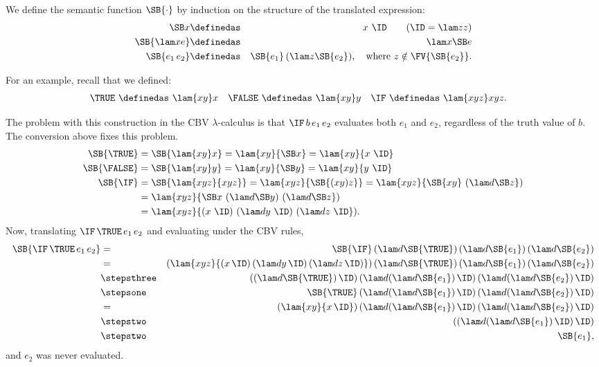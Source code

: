 We define the semantic function $\SB{\cdot}$ by
induction on the structure of the translated expression:
\begin{eqnarray*}
\SB x &\definedas& x~\ID \qquad (\ID = \lam zz)    \\
\SB{\lam xe} &\definedas& \lam x{\SB e}        \\
\SB{e_1\,e_2} &\definedas& \SB{e_1}\,(\lam z{\SB{e_2}}),
  \quad\mbox{where $z\notin\FV{\SB{e_2}}$.}
\end{eqnarray*}

For an example, recall that we defined: 
\begin{align*}
\TRUE\ &\definedas\ \lam{xy}x & \FALSE\ &\definedas\ \lam{xy}y & \IF\ &\definedas\ \lam{xyz}xyz.
\end{align*}

The problem with this construction in the CBV $\lambda$-calculus is that
$\IF\,b\,e_1\,e_2$ evaluates both $e_1$ and $e_2$, regardless of the truth
value of $b$. The conversion above fixes this problem.
\begin{align*}
\SB{\TRUE} &= \SB{\lam{xy}x} = \lam{xy}{\SB x} = \lam{xy}{x~\ID}\\
\SB{\FALSE} &= \SB{\lam{xy}y} = \lam{xy}{\SB y} = \lam{xy}{y~\ID}\\
\SB{\IF} &= \SB{\lam{xyz}{xyz}} = \lam{xyz}{\SB{(xy)z}} = \lam{xyz}{\SB{xy}~(\lam d{\SB z}})\\
&= \lam{xyz}{\SB x~(\lam d{\SB y})~(\lam d{\SB z}})\\
&= \lam{xyz}{(x~\ID)~(\lam d{y~\ID})~(\lam d{z~\ID}}).
\end{align*}
Now, translating $\IF\,\TRUE\,e_1\,e_2$ and evaluating under the CBV rules,
\begin{eqnarray*}
\SB{\IF\,\TRUE\,e_1\,e_2}
&=& \SB{\IF}\,(\lam d{\SB{\TRUE}})\,(\lam d{\SB{e_1}})\,(\lam d{\SB{e_2}})\\
&=& (\lam{xyz}{(x\,\ID)\,(\lam d{y\,\ID})\,(\lam d{z\,\ID})})\,(\lam d{\SB{\TRUE}})\,(\lam d{\SB{e_1}})\,(\lam d{\SB{e_2}})\\
&\stepsthree& ((\lam d{\SB{\TRUE}})\,\ID)\,(\lam d{(\lam d{\SB{e_1}})\,\ID})\,(\lam d{(\lam d{\SB{e_2}})\,\ID})\\
&\stepsone& {\SB{\TRUE}}\,(\lam d{(\lam d{\SB{e_1}})\,\ID})\,(\lam d{(\lam d{\SB{e_2}})\,\ID})\\
&=& (\lam{xy}{x\,\ID})\,(\lam d{(\lam d{\SB{e_1}})\,\ID})\,(\lam d{(\lam d{\SB{e_2}})\,\ID})\\
&\stepstwo& ({(\lam d{(\lam d{\SB{e_1}})\,\ID})\,\ID})\\
&\stepstwo& \SB{e_1},
\end{eqnarray*}
and $e_2$ was never evaluated.
